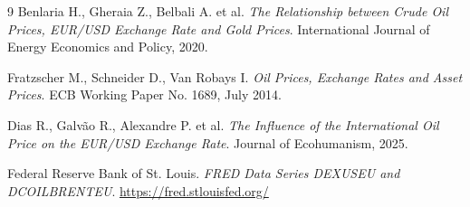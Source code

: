 \documentclass[a4paper,12pt]{article}
\begin{document}
\begin{thebibliography}{9}
Benlaria H., Gheraia Z., Belbali A. et al.
\textit{The Relationship between Crude Oil Prices, EUR/USD Exchange Rate and Gold Prices}.
International Journal of Energy Economics and Policy, 2020.

Fratzscher M., Schneider D., Van Robays I.
\textit{Oil Prices, Exchange Rates and Asset Prices}.
ECB Working Paper No. 1689, July 2014.

Dias R., Galv\~ao R., Alexandre P. et al.
\textit{The Influence of the International Oil Price on the EUR/USD Exchange Rate}.
Journal of Ecohumanism, 2025.

Federal Reserve Bank of St. Louis.
\textit{FRED Data Series DEXUSEU and DCOILBRENTEU}.
\url{https://fred.stlouisfed.org/}
\end{thebibliography}
\end{document}
